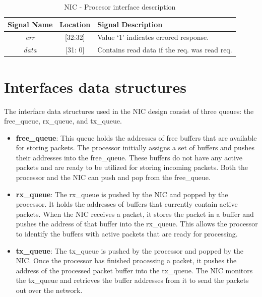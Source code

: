 \documentclass[12pt]{report}
\begin{document}
				\begin{table}[!htbp]
					\centering
					\begin{tabular}{ccl}
						\hline
						\textbf{Signal Name} 		& \textbf{Location} 		&\textbf{Signal Description}  \\ \hline
						\textit{err}			& [32:32]			& Value `1' indicates errored response.\\\hline
						\textit{data}   		& [31: 0] 			& Contains read data if the req. was read req.\\ \hline
					\end{tabular}
					\caption{ NIC - Procesor interface description}
					\label{tab:NIC-Proc-interface-resp}
				\end{table}

	
	\section{Interfaces data structures}

		The interface data structures used in the NIC design consist of three queues: the free\_queue, rx\_queue, and tx\_queue.




	\begin{itemize}
		\item \textbf{free\_queue}: This queue holds the addresses of free buffers that are available for storing packets. The processor initially assigns a set of buffers and pushes their addresses into the free\_queue. These buffers do not have any active packets and are ready to be utilized for storing incoming packets. Both the processor and the NIC can push and pop from the free\_queue.\\

		\item \textbf{rx\_queue}: The rx\_queue is pushed by the NIC and popped by the processor. It holds the addresses of buffers that currently contain active packets. When the NIC receives a packet, it stores the packet in a buffer and pushes the address of that buffer into the rx\_queue. This allows the processor to identify the buffers with active packets that are ready for processing.

		\item \textbf{tx\_queue}: The tx\_queue is pushed by the processor and popped by the NIC. Once the processor has finished processing a packet, it pushes the address of the processed packet buffer into the tx\_queue. The NIC monitors the tx\_queue and retrieves the buffer addresses from it to send the packets out over the network.\\
	\end{itemize}
\end{document}
